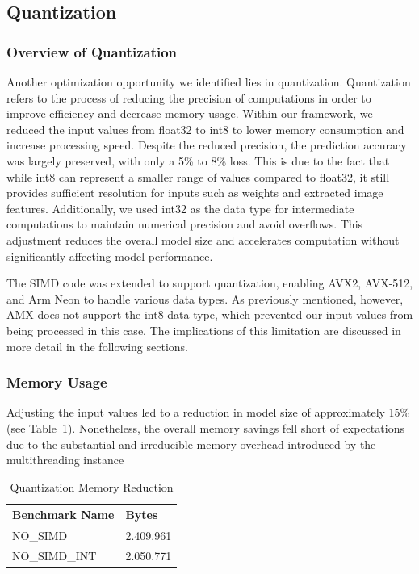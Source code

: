 \documentclass[modern,longauthor]{aastex7}
\begin{document}
\subsection{Quantization}\label{sec:quantization}
\subsubsection{Overview of Quantization}
Another optimization opportunity we identified lies in quantization. Quantization refers to the process of reducing the precision of computations in order to improve efficiency and decrease memory usage. Within our framework, we reduced the input values from float32 to int8 to lower memory consumption and increase processing speed. Despite the reduced precision, the prediction accuracy was largely preserved, with only a 5\% to 8\% loss. This is due to the fact that while int8 can represent a smaller range of values compared to float32, it still provides sufficient resolution for inputs such as weights and extracted image features. Additionally, we used int32 as the data type for intermediate computations to maintain numerical precision and avoid overflows. This adjustment reduces the overall model size and accelerates computation without significantly affecting model performance.

The SIMD code was extended to support quantization, enabling AVX2, AVX-512, and Arm Neon to handle various data types. As previously mentioned, however, AMX does not support the int8 data type, which prevented our input values from being processed in this case. The implications of this limitation are discussed in more detail in the following sections.
\subsubsection{Memory Usage}
Adjusting the input values led to a reduction in model size of approximately 15\% (see Table~\ref{tab:quant_mem_red}). Nonetheless, the overall memory savings fell short of expectations due to the substantial and irreducible memory overhead introduced by the multithreading instance

\begin{table}[htb!]
\centering
\caption{Quantization Memory Reduction\label{tab:quant_mem_red}}
\begin{tabular}{p{3cm} p{2cm}}
\hline
Benchmark Name & Bytes \\
\hline
NO\_SIMD & 2.409.961\\
\hline
NO\_SIMD\_INT & 2.050.771 \\
\hline
\end{tabular}
\end{table}
\FloatBarrier
\end{document}
